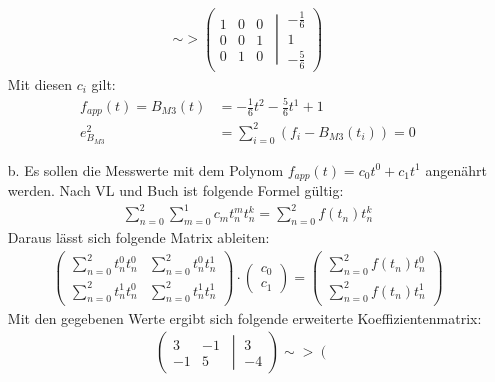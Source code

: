 \begin{itemize}
\begin{align*}
			\sim> \left(\left.\begin{matrix} 1 & 0 & 0\\0 & 0 & 1\\ 0 & 1 & 0\end{matrix}\ \ \right|\ \begin{matrix}-\frac{1}{6} \\ 1 \\ -\frac{5}{6} \end{matrix}\right)
		\end{align*}
		Mit diesen $c_i$ gilt:
		\begin{align*}
			f_{app}(t) = B_{M3}(t)	&= -\frac{1}{6}t^2 -\frac{5}{6}t^1 +1\\
			e_{B_{M3}}^2			&= \sum_{i=0}^2\left( f_i - B_{M3}(t_i) \right)= 0
		\end{align*}
		\item[b.] Es sollen die Messwerte mit dem Polynom $f_{app}(t) = c_0t^0 +c_1t^1$ angenährt werden. Nach VL und Buch ist folgende Formel gültig:
		\begin{align*}
			\sum_{n=0}^2\sum_{m=0}^1c_m t_n^mt_n^k = \sum_{n=0}^2f(t_n)t_n^k
		\end{align*}
		Daraus lässt sich folgende Matrix ableiten:
		\begin{align*}
			\left(\begin{matrix}
				\sum_{n=0}^2 t_n^0t_n^0 & \sum_{n=0}^2 t_n^0t_n^1\\
				\sum_{n=0}^2 t_n^1t_n^0 & \sum_{n=0}^2 t_n^1t_n^1
			\end{matrix}\right)\cdot\left(\begin{matrix} c_0\\ c_1\end{matrix}\right)
			=
			\left(\begin{matrix}
				\sum_{n=0}^{2}f(t_n)t_n^0\\
				\sum_{n=0}^2f(t_n)t_n^1
			\end{matrix}\right)
		\end{align*}
		Mit den gegebenen Werte ergibt sich folgende erweiterte Koeffizientenmatrix:
		\begin{align*}
			\left(\left. \begin{matrix}
				3	&	-1 \\ -1 	& 5\end{matrix}\ \ \right|\ \begin{matrix} 3\\-4
			\end{matrix}\right)
			\sim>
			\left(\left. \begin{matrix}

\end{matrix}
\end{align*}
\end{itemize}
